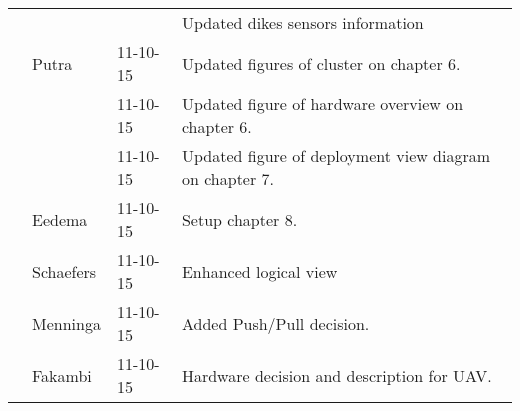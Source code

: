 \begin{longtable}{L{} L{} L{} L{}}
        &           &          & Updated dikes sensors information \\
        & Putra     & 11-10-15 & Updated figures of cluster on chapter 6.\\
        &           & 11-10-15 & Updated figure of hardware overview on chapter 6.\\
        &           & 11-10-15 & Updated figure of deployment view diagram on chapter 7.\\
        & Eedema    & 11-10-15 & Setup chapter 8.\\
        & Schaefers & 11-10-15 & Enhanced logical view \\
        & Menninga  & 11-10-15 & Added Push/Pull decision. \\
        & Fakambi   & 11-10-15 & Hardware decision and description for UAV. \\
    
    \bottomrule
\end{longtable}